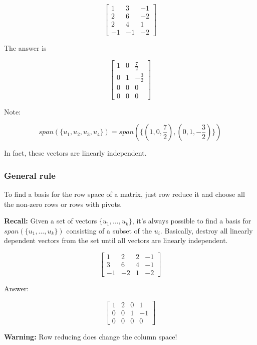 \documentclass{article}
\newtheorem{one minute paper}[theorem]{One Minute Paper}
\begin{document}
\[\left[\begin{array}{ccc}
    1 & 3 & -1 \\
    2 & 6 & -2 \\
    2 & 4 & 1 \\
    -1 & -1 & -2
\end{array}\right]\]

The answer is 

\[\left[\begin{array}{ccc}
    1 & 0 & \frac{7}{2} \\
    0 & 1 & -\frac{3}{2} \\
    0 & 0 & 0 \\
    0 & 0 & 0
\end{array}\right]\]

Note:

\begin{equation}
    span(\{u_1,u_2,u_3,u_4\}) = span(\{(1,0,\frac{7}{2}), (0,1,-\frac{3}{2})\})
\end{equation}

In fact, these vectors are linearly independent. 

\subsubsection*{General rule}

To find a basis for the row space of a matrix, just row reduce it and choose all the non-zero rows or rows with pivots. 

\textbf{Recall:} Given a set of vectors $\{u_1, \dots, u_k\}$, it's always possible to find a basis for $span(\{u_1, \dots, u_k\})$ consisting of a subset of the $u_i$. Basically, 
destroy all linearly dependent vectors from the set until all vectors are linearly independent. 

\[\left[\begin{array}{cccc}
    1 & 2 & 2 & -1 \\
    3 & 6 & 4 & -1 \\
    -1 & -2 & 1 & -2
\end{array}\right]\]

Answer:

\[\left[\begin{array}{cccc}
    1 & 2 & 0 & 1\\
    0 & 0 & 1 & -1\\
    0 & 0 & 0 & 0
\end{array}\right]\]

\textbf{Warning:} Row reducing does change the column space!
\end{document}
